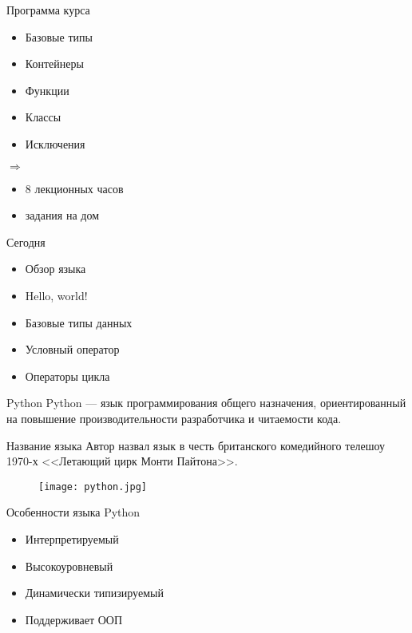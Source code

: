 \documentclass[hyperref={pdftex,unicode}]{beamer}
\begin{document}
\begin{frame}{Программа курса}
  \begin{minipage}{0.4\linewidth}
    \begin{itemize}
    \item Базовые типы
    \item Контейнеры
    \item Функции
    \item Классы
    \item Исключения
    \end{itemize}
  \end{minipage}
  $ \Longrightarrow $
  \hfill
  \begin{minipage}{0.4\linewidth}
    \begin{itemize}  
    \item 8 лекционных часов
    \item задания на дом
   \end{itemize}
  \end{minipage}
\end{frame}

\begin{frame}{Сегодня}
  \begin{itemize}
  \item Обзор языка
  \item Hello, world!
  \item Базовые типы данных
  \item Условный оператор
  \item Операторы цикла
  \end{itemize}
\end{frame}

\begin{frame}{Python}
  Python --- язык программирования общего назначения,
  ориентированный на повышение производительности разработчика и читаемости кода.
\end{frame}

\begin{frame}{Название языка}
  Автор назвал язык в честь британского комедийного телешоу 1970-х
  <<Летающий цирк Монти Пайтона>>.

  \begin{figure}[H]
    \texttt{[image: python.jpg]}
  \end{figure}
\end{frame}

\begin{frame}{Особенности языка Python}
  \begin{itemize}
    \item Интерпретируемый
    \item Высокоуровневый
    \item Динамически типизируемый
    \item Поддерживает ООП
  \end{itemize}
\end{frame}
\end{document}
